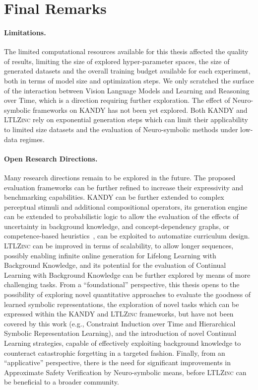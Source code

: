 \section{Final Remarks}
\paragraph{Limitations.} The limited computational resources available for this thesis affected the quality of results, limiting the size of explored hyper-parameter spaces, the size of generated datasets and the overall training budget available for each experiment, both in terms of model size and optimization steps. We only scratched the surface of the interaction between Vision Language Models and Learning and Reasoning over Time, which is a direction requiring further exploration. The effect of Neuro-symbolic frameworks on \textsc{KANDY} has not been yet explored. Both \textsc{KANDY} and \textsc{LTLZinc} rely on exponential generation steps which can limit their applicability to limited size datasets and the evaluation of Neuro-symbolic methods under low-data regimes.


\paragraph{Open Research Directions.} Many research directions remain to be explored in the future. The proposed evaluation frameworks can be further refined to increase their expressivity and benchmarking capabilities. \textsc{KANDY} can be further extended to complex perceptual stimuli and additional compositional operators, its generation engine can be extended to probabilistic logic to allow the evaluation of the effects of uncertainty in background knowledge, and concept-dependency graphs, or competence-based heuristics~\cite{toborek2025beyond}, can be exploited to automatize curriculum design. \textsc{LTLZinc} can be improved in terms of scalability, to allow longer sequences, possibly enabling infinite online generation for Lifelong Learning with Background Knowledge, and its potential for the evaluation of Continual Learning with Background Knowledge can be further explored by means of more challenging tasks.
%
From a ``foundational'' perspective, this thesis opens to the possibility of exploring novel quantitative approaches to evaluate the goodness of learned symbolic representations, the exploration of novel tasks which can be expressed within the \textsc{KANDY} and \textsc{LTLZinc} frameworks, but have not been covered by this work (e.g., Constraint Induction over Time and Hierarchical Symbolic Representation Learning), and the introduction of novel Continual Learning strategies, capable of effectively exploiting background knowledge to counteract catastrophic forgetting in a targeted fashion.
%
Finally, from an ``applicative'' perspective, there is the need for significant improvements in Approximate Safety Verification by Neuro-symbolic means, before \textsc{LTLZinc} can be beneficial to a broader community.